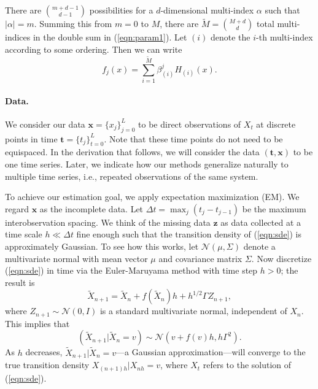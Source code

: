 \documentclass{article}
\newcommand{\bx}{\ensuremath{\mathbf{x}}}
\newcommand{\bt}{\ensuremath{\mathbf{t}}}
\newcommand{\bz}{\ensuremath{\mathbf{z}}}
\begin{document}
There are $\binom{m + d - 1}{d-1}$ possibilities for a $d$-dimensional multi-index $\alpha$ such that $|\alpha| = m$.  Summing this from $m=0$ to $M$, there are $\widetilde{M} = \binom{M+d}{d}$ total multi-indices in the double sum in (\ref{eqn:param1}).  Let $(i)$ denote the $i$-th multi-index according to some ordering.  Then we can write
\begin{equation}
\label{eqn:param2}
f_j(x) = \sum_{i=1}^{\widetilde{M}} \beta^j_{(i)} H_{(i)}(x).
\end{equation}

\paragraph{Data.} We consider our data $\bx = \{x_j\}_{j=0}^L$ to be direct observations of $X_t$ at discrete points in time $\bt = \{t_j\}_{t=0}^L$.  Note that these time points do not need to be equispaced.  In the derivation that follows, we will consider the data $(\bt, \bx)$ to be one time series.  Later, we indicate how our methods generalize naturally to multiple time series, i.e., repeated observations of the same system.

To achieve our estimation goal, we apply expectation maximization (EM).  We regard $\bx$ as the incomplete data.  Let $\Delta t = \max_{j} (t_j - t_{j-1})$ be the maximum interobservation spacing.  We think of the missing data $\bz$ as data collected at a time scale $h \ll \Delta t$ fine enough such that the transition density of (\ref{eqn:sde}) is approximately Gaussian.  To see how this works, let $\mathcal{N}(\mu, \Sigma)$ denote a multivariate normal with mean vector $\mu$ and covariance matrix $\Sigma$.  Now discretize (\ref{eqn:sde}) in time via the Euler-Maruyama method with time step $h > 0$; the result is
\begin{equation} \label{eqn:euler}
\widetilde{X}_{n+1} = \widetilde{X}_n + f(\widetilde{X}_n) h + h^{1/2} \Gamma Z_{n+1},
\end{equation}
where $Z_{n+1} \sim \mathcal{N}(0, I)$ is a standard multivariate normal, independent of $X_n$.  This implies that
\begin{equation}
\label{eqn:condden}
(\widetilde{X}_{n+1} | \widetilde{X}_n = v) \sim \mathcal{N}(v + f(v) h, h \Gamma^2).
\end{equation}
As $h$ decreases, $\widetilde{X}_{n+1} | \widetilde{X}_n = v$---a Gaussian approximation---will converge to the true transition density $X_{(n+1)h} | X_{nh} = v$, where $X_t$ refers to the solution of (\ref{eqn:sde}).
\end{document}
